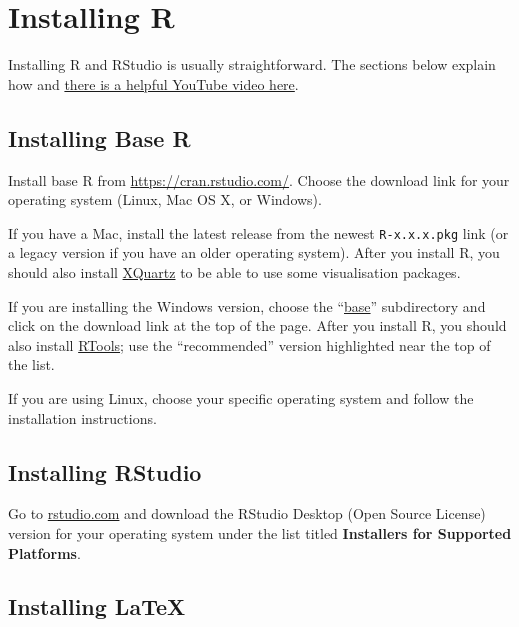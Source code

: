 \documentclass[
  oneside]{book}
\begin{document}
\hypertarget{appendix-appendices}{%
\appendix}


\hypertarget{installingr}{%
\chapter{Installing R}\label{installingr}}

Installing R and RStudio is usually straightforward. The sections below explain how and \href{https://www.youtube.com/watch?v=lVKMsaWju8w}{there is a helpful YouTube video here}.

\hypertarget{installing-base-r}{%
\section{Installing Base R}\label{installing-base-r}}

Install base R from \url{https://cran.rstudio.com/}. Choose the download link for your operating system (Linux, Mac OS X, or Windows).

If you have a Mac, install the latest release from the newest \texttt{R-x.x.x.pkg} link (or a legacy version if you have an older operating system). After you install R, you should also install \href{http://xquartz.macosforge.org/}{XQuartz} to be able to use some visualisation packages.

If you are installing the Windows version, choose the ``\href{https://cran.rstudio.com/bin/windows/base/}{base}'' subdirectory and click on the download link at the top of the page. After you install R, you should also install \href{https://cran.rstudio.com/bin/windows/Rtools/}{RTools}; use the ``recommended'' version highlighted near the top of the list.

If you are using Linux, choose your specific operating system and follow the installation instructions.

\hypertarget{installing-rstudio}{%
\section{Installing RStudio}\label{installing-rstudio}}

Go to \href{https://www.rstudio.com/products/rstudio/download/\#download}{rstudio.com} and download the RStudio Desktop (Open Source License) version for your operating system under the list titled \textbf{Installers for Supported Platforms}.

\hypertarget{installing-latex}{%
\section{Installing LaTeX}\label{installing-latex}}
\end{document}
